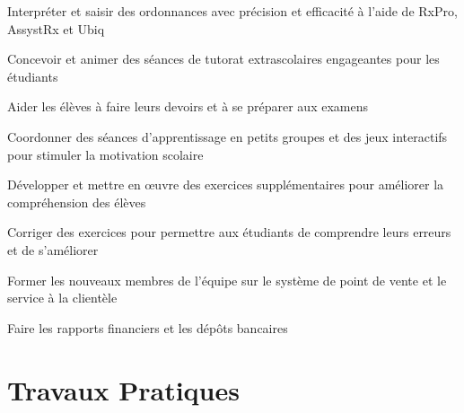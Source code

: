\documentclass[letterpaper,10pt]{article}
\begin{document}
  \begin{resume_list}
    \item Interpréter et saisir des ordonnances avec précision et efficacité à l'aide de RxPro, AssystRx et Ubiq
  \end{resume_list}

  \begin{resume_list}
    \item Concevoir et animer des séances de tutorat extrascolaires engageantes pour les étudiants
    \item Aider les élèves à faire leurs devoirs et à se préparer aux examens
    \item Coordonner des séances d'apprentissage en petits groupes et des jeux interactifs pour stimuler la motivation scolaire
    \item Développer et mettre en œuvre des exercices supplémentaires pour améliorer la compréhension des élèves
    \item Corriger des exercices pour permettre aux étudiants de comprendre leurs erreurs et de s'améliorer
  \end{resume_list}

  \begin{resume_list}
    \item Former les nouveaux membres de l'équipe sur le système de point de vente et le service à la clientèle
    \item Faire les rapports financiers et les dépôts bancaires
  \end{resume_list}

  \pagebreak


  \section{Travaux Pratiques}
\end{document}
